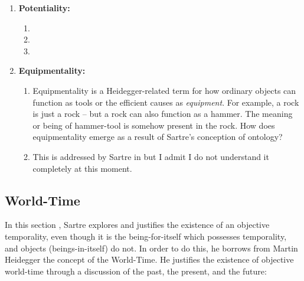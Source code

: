 \begin{enumerate}
\begin{enumerate}
  \end{enumerate}
  \item \textbf{Potentiality:}
  \begin{enumerate}
    \item {}
    \item {}
    \item {}
  \end{enumerate}
  \item \textbf{Equipmentality:}
  \begin{enumerate}
    \item Equipmentality is a Heidegger-related term for how ordinary objects can function as tools or the efficient causes as \emph{equipment}. For example, a rock is just a rock -- but a rock can also function as a hammer. The meaning or being of hammer-tool is somehow present in the rock. How does equipmentality emerge as a result of Sartre's conception of ontology?
    \item This is addressed by Sartre in \autocite[282 -- 284]{sartre} but I admit I do not understand it completely at this moment.
  \end{enumerate}
\end{enumerate}

\subsection{World-Time}

In this section \autocite[285 -- 300]{sartre}, Sartre explores and justifies the existence of an objective temporality, even though it is the being-for-itself which possesses temporality, and objects (beings-in-itself) do not. In order to do this, he borrows from Martin Heidegger the concept of the World-Time. He justifies the existence of objective world-time through a discussion of the past, the present, and the future:

